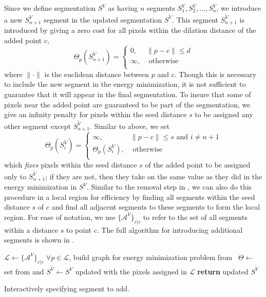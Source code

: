 \documentclass[]{spie}  %
\begin{document}
Since we define segmentation $S^V$ as having $n$ segments $S^V_1,
S^V_2, \ldots, S^V_n$, we introduce a new $S^V_{n+1}$ segment in the
updated segmentation $S^{\tilde{V}}$.  This segment
$S^{\tilde{V}}_{n+1}$ is introduced by giving a zero cost for all
pixels within the dilation distance of the added point $c$, \ie
\begin{equation}
  \label{eq:d}
  \Theta_p(S^{\tilde{V}}_{n+1}) = \left\{
    \begin{array}{lcr}
      0, & \| p - c \| \leq d  \\
      \infty, & \textrm{ otherwise} \\
    \end{array}
  \right.
\end{equation}
where $\| \cdot \|$ is the euclidean distance between $p$ and $c$.
Though this is necessary to include the new segment in the energy
minimization, it is not sufficient to guarantee that it will appear in
the final segmentation.  To insure that some of pixels near the added
point are guaranteed to be part of the segmentation, we give an
infinity penalty for pixels within the seed distance $s$ to be
assigned any other segment except $S^{\tilde{V}}_{n+1}$.  Similar to
 above, we set
\begin{equation}
  \label{eq:s}
  \Theta_p(S^{\tilde{V}}_i) = \left\{
    \begin{array}{lcr}
      \infty, & \| p - c \| \leq s \textrm{ and } i \neq n+1  \\
      \Theta_p(S^{V}_i), & \textrm{ otherwise} \\
    \end{array}
  \right.
\end{equation}
which \emph{fixes} pixels within the seed distance $s$ of the added
point to be assigned only to $S^{\tilde{V}}_{n+1}$; if they are not,
then they take on the same value as they did in the energy
minimization in $S^V$.  Similar to the removal step in ,
we can also do this procedure in a local region for efficiency by
finding all segments within the seed distance $s$ of $c$ and find all
adjacent segments to these segments to form the local region.  For
ease of notation, we use $\{\mathcal{A}^V\}_{c|s}$ to refer to the set
of all segments within a distance $s$ to point $c$.  The full
algorithm for introducing additional segments is shown in
.
\begin{algorithm}[!t]
  \centering
  \algrenewcommand{}
  \begin{algorithmic}[1]
    \State $\mathcal{L} \gets \{\mathcal{A}^V\}_{c|s}$
    \State $\forall p \in \mathcal{L}$, build graph for energy minimization problem from~\cite{waggoner:11}
    \State $\Theta \gets $ set from  and 
    \State $S^{\tilde{V}} \gets S^V$ updated with the pixels assigned in $\mathcal{L}$
    \State \textbf{return} updated $S^{\tilde{V}}$
    \EndFunction
  \end{algorithmic}
  \caption{Interactively specifying segment to add.}
  \label{alg:addition}
\end{algorithm}
\end{document}
